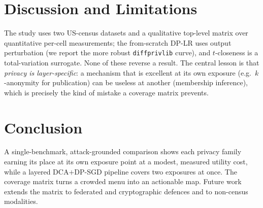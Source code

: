 \documentclass[conference]{IEEEtran}
\begin{document}
\section{Discussion and Limitations}
The study uses two US-census datasets and a qualitative top-level matrix over
quantitative per-cell measurements; the from-scratch DP-LR uses output
perturbation (we report the more robust \texttt{diffprivlib} curve), and
$t$-closeness is a total-variation surrogate. None of these reverse a result.
The central lesson is that \emph{privacy is layer-specific}: a mechanism that is
excellent at its own exposure (e.g.\ $k$-anonymity for publication) can be
useless at another (membership inference), which is precisely the kind of
mistake a coverage matrix prevents.

\section{Conclusion}
A single-benchmark, attack-grounded comparison shows each privacy family earning
its place at its own exposure point at a modest, measured utility cost, while a
layered DCA$+$DP-SGD pipeline covers two exposures at once. The coverage matrix
turns a crowded menu into an actionable map. Future work extends the matrix to
federated and cryptographic defences and to non-census modalities.



\end{document}
